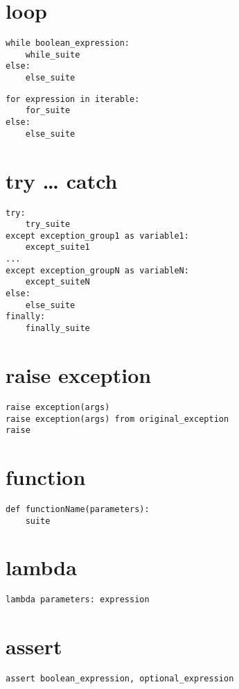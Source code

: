\documentclass[11pt]{article}
\begin{document}
\section{loop}
\label{sec-23}
\begin{verbatim}
while boolean_expression:
    while_suite
else:
    else_suite
\end{verbatim}

\begin{verbatim}
for expression in iterable:
    for_suite
else:
    else_suite
\end{verbatim}

\section{try \ldots{} catch}
\label{sec-24}
\begin{verbatim}
try:
    try_suite
except exception_group1 as variable1:
    except_suite1
...
except exception_groupN as variableN:
    except_suiteN
else:
    else_suite
finally:
    finally_suite
\end{verbatim}

\section{raise exception}
\label{sec-25}
\begin{verbatim}
raise exception(args)
raise exception(args) from original_exception
raise
\end{verbatim}

\section{function}
\label{sec-26}
\begin{verbatim}
def functionName(parameters):
    suite
\end{verbatim}


\section{lambda}
\label{sec-27}
\begin{verbatim}
lambda parameters: expression
\end{verbatim}

\section{assert}
\label{sec-28}
\begin{verbatim}
assert boolean_expression, optional_expression
\end{verbatim}
\end{document}
